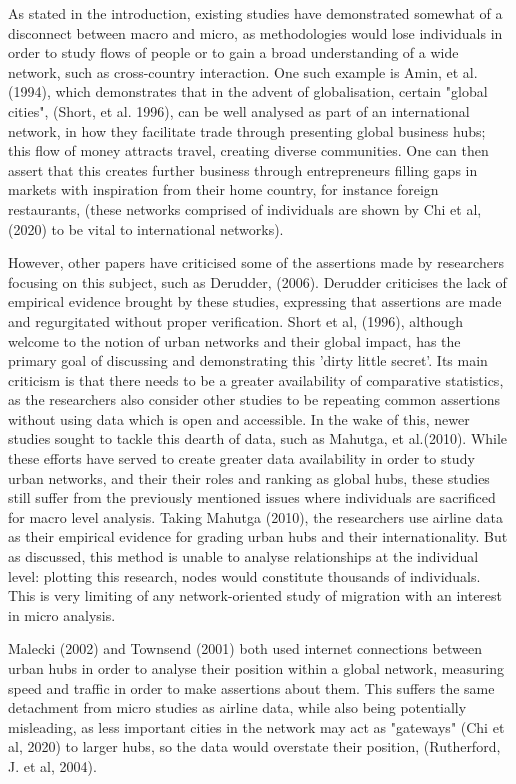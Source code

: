 \documentclass[12pt]{article}
\begin{document}
As stated in the introduction, existing studies have demonstrated somewhat of a disconnect 
between macro and micro, as methodologies would lose individuals in order to 
study flows of people or to gain a broad understanding of a wide network, 
such as cross-country interaction. One such example 
is Amin, et al. (1994), which demonstrates that in the advent of globalisation, certain 
"global cities", (Short, et al. 1996), can be well analysed as part of an international 
network, in how they facilitate trade through presenting global business hubs; this flow 
of money attracts travel, creating diverse communities. One can then assert that this creates 
further business through entrepreneurs filling gaps in markets with inspiration from their 
home country, for instance foreign restaurants, (these networks comprised of individuals are shown by Chi et al, (2020) to 
be vital to international networks). 

However, other 
papers have criticised some of the assertions made by researchers focusing on this subject, 
such as Derudder, (2006). Derudder criticises the lack of empirical evidence brought by 
these studies, expressing that assertions are made and regurgitated without proper 
verification. Short et al, (1996), although 
welcome to the notion of urban networks and their global impact, has the primary goal 
of discussing and demonstrating this 'dirty little secret'. Its main criticism is that 
there needs to be a greater availability of comparative statistics, as the researchers 
also consider other studies to be repeating common assertions without using data which is open 
and accessible. In the wake of this, newer studies sought to tackle this dearth of data, 
such as Mahutga, et al.(2010). While these efforts have served to create 
greater data availability in order to study urban networks, and their their roles and 
ranking as global hubs, these studies still suffer 
from the previously mentioned issues where individuals are sacrificed for macro level analysis. 
Taking Mahutga (2010), the researchers use airline data as their empirical evidence 
for grading urban hubs and their internationality. But as discussed, this method 
is unable to analyse relationships at the individual level: plotting this 
research, nodes would constitute thousands of individuals. This is very limiting of 
any network-oriented study of migration with an interest in micro analysis.

Malecki (2002) and Townsend (2001) both used internet connections between urban hubs 
in order to analyse their position within a global network, measuring speed and traffic
in order to make assertions about them. This suffers the same detachment from micro 
studies as airline data, while also being potentially misleading, as 
less important cities in the network may act as "gateways" (Chi et al, 2020) to
larger hubs, so the data would overstate their position, (Rutherford, J. et al, 2004).
\end{document}
